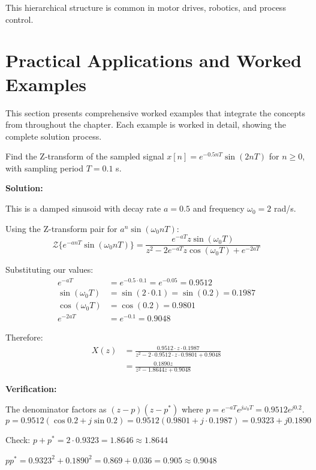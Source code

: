 This hierarchical structure is common in motor drives, robotics, and process control.

\section{Practical Applications and Worked Examples}
\label{sec:discrete_examples}

This section presents comprehensive worked examples that integrate the concepts from throughout the chapter. Each example is worked in detail, showing the complete solution process.

\begin{example}
\label{ex:z_damped_sinusoid}

Find the Z-transform of the sampled signal $x[n] = e^{-0.5nT}\sin(2nT)$ for $n \geq 0$, with sampling period $T = 0.1$ s.

\textbf{Solution:}

This is a damped sinusoid with decay rate $a = 0.5$ and frequency $\omega_0 = 2$ rad/s.

Using the Z-transform pair for $a^n \sin(\omega_0 nT)$:
\begin{equation}
\mathcal{Z}\{e^{-anT}\sin(\omega_0 nT)\} = \frac{e^{-aT}z\sin(\omega_0 T)}{z^2 - 2e^{-aT}z\cos(\omega_0 T) + e^{-2aT}}
\end{equation}

Substituting our values:
\begin{align}
e^{-aT} &= e^{-0.5 \cdot 0.1} = e^{-0.05} = 0.9512 \\
\sin(\omega_0 T) &= \sin(2 \cdot 0.1) = \sin(0.2) = 0.1987 \\
\cos(\omega_0 T) &= \cos(0.2) = 0.9801 \\
e^{-2aT} &= e^{-0.1} = 0.9048
\end{align}

Therefore:
\begin{align}
X(z) &= \frac{0.9512 \cdot z \cdot 0.1987}{z^2 - 2 \cdot 0.9512 \cdot z \cdot 0.9801 + 0.9048} \\
&= \frac{0.1890z}{z^2 - 1.8644z + 0.9048}
\end{align}

\textbf{Verification:}

The denominator factors as $(z - p)(z - p^*)$ where $p = e^{-aT}e^{j\omega_0 T} = 0.9512 e^{j0.2}$.
\begin{equation}
p = 0.9512(\cos 0.2 + j\sin 0.2) = 0.9512(0.9801 + j \cdot 0.1987) = 0.9323 + j0.1890
\end{equation}

Check: $p + p^* = 2 \cdot 0.9323 = 1.8646 \approx 1.8644$ \checkmark

$pp^* = 0.9323^2 + 0.1890^2 = 0.869 + 0.036 = 0.905 \approx 0.9048$ \checkmark
\end{example}

